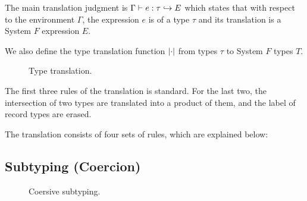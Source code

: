 
The main translation judgment is $ \Gamma \vdash e : \tau \hookrightarrow E $ which
states that with respect to the environment $ \Gamma $, the \name expression
$ e $ is of a \name type $ \tau $ and its translation is a System $ F $ expression $ E $.

We also define the type translation function $ \lvert \cdot \rvert $ from \name types
$ \tau $ to System $ F $ types $ T $.

\begin{figure}[h]

\caption{Type translation.}
\end{figure}

The first three rules of the translation is standard. For the last two, the
intersection of two types are translated into a product of them, and the label
of record types are erased.

The translation consists of four sets of rules, which are explained below:

\subsection{Subtyping (Coercion)}


\begin{figure*}

\caption{Coersive subtyping.}
\end{figure*}

